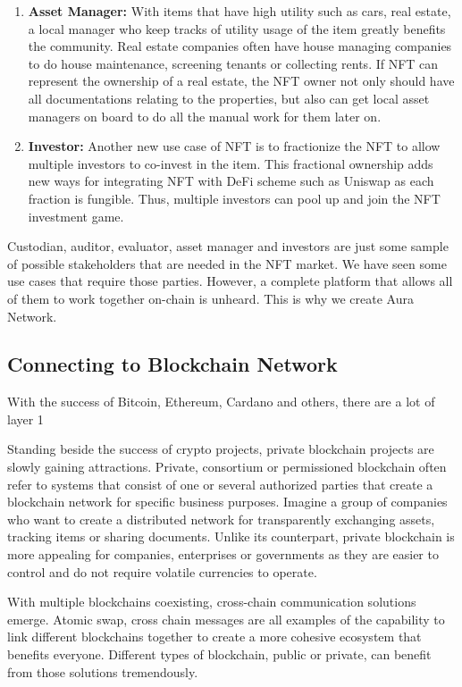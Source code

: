 \documentclass[12pt]{article}
\begin{document}
\begin{enumerate}
    \item \textbf{Asset Manager:} With items that have high utility such as cars, real estate, a local manager who keep tracks of utility usage of the item greatly benefits the community. Real estate companies often have house managing companies to do house maintenance, screening tenants or collecting rents. If NFT can represent the ownership of a real estate, the NFT owner not only should have all documentations relating to the properties, but also can get local asset managers on board to do all the manual work for them later on. 
    
    \item \textbf{Investor:} Another new use case of NFT is to fractionize the NFT to allow multiple investors to co-invest in the item. This fractional ownership adds new ways for integrating NFT with DeFi scheme such as Uniswap as each fraction is fungible. Thus, multiple investors can pool up and join the NFT investment game.
\end{enumerate}

Custodian, auditor, evaluator, asset manager and investors are just some sample of possible stakeholders that are needed in the NFT market. We have seen some use cases that require those parties. However, a complete platform that allows all of them to work together on-chain is unheard. This is why we create Aura Network.    

\subsection{Connecting to Blockchain Network}

With the success of Bitcoin, Ethereum, Cardano and others, there are a lot of layer 1  

Standing beside the success of crypto projects, private blockchain projects are slowly gaining attractions. Private, consortium or permissioned blockchain often refer to systems that consist of one or several authorized parties that create a blockchain network for specific business purposes. Imagine a group of companies who want to create a distributed network for transparently exchanging assets, tracking items or sharing documents. Unlike its counterpart, private blockchain is more appealing for companies, enterprises or governments as they are easier to control and do not require volatile currencies to operate.

With multiple blockchains coexisting, cross-chain communication solutions emerge. Atomic swap, cross chain messages are all examples of the capability to link different blockchains together to create a more cohesive ecosystem that benefits everyone. Different types of blockchain, public or private, can benefit from those solutions tremendously. 
\end{document}
